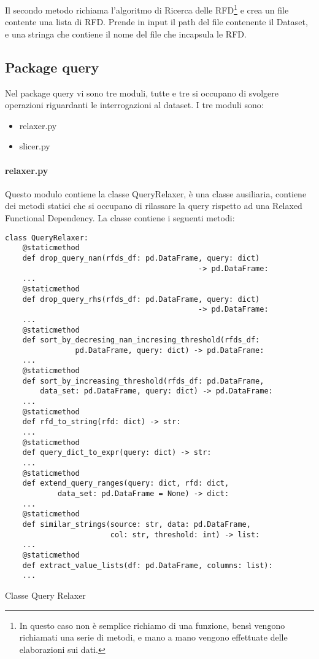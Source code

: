 Il secondo metodo richiama l'algoritmo di Ricerca delle RFD\footnote{In questo caso non è semplice richiamo di una funzione, bensì vengono richiamati una serie di metodi, e mano a mano vengono effettuate delle elaborazioni sui dati.} e crea un file contente una lista di RFD. Prende in input il path del file contenente il Dataset, e una stringa che contiene il nome del file che incapsula le RFD. 

\subsection{Package query}
Nel package query vi sono tre moduli, tutte e tre si occupano di svolgere operazioni riguardanti le interrogazioni al dataset.
I tre moduli sono:
\begin{itemize}[noitemsep]
\let\labelitemi\labelitemii
    \item relaxer.py
    \item slicer.py
\end{itemize}

\paragraph{relaxer.py}
Questo modulo contiene la classe QueryRelaxer, è una classe ausiliaria, contiene dei metodi statici che si occupano di rilassare la query rispetto ad una Relaxed Functional Dependency. La classe contiene i seguenti metodi:

\begin{listing}[H]
\begin{verbatim}
class QueryRelaxer:
    @staticmethod
    def drop_query_nan(rfds_df: pd.DataFrame, query: dict) 
                                            -> pd.DataFrame:
    ...
    @staticmethod
    def drop_query_rhs(rfds_df: pd.DataFrame, query: dict)
                                            -> pd.DataFrame:
    ...
    @staticmethod
    def sort_by_decresing_nan_incresing_threshold(rfds_df: 
                pd.DataFrame, query: dict) -> pd.DataFrame:
    ...
    @staticmethod
    def sort_by_increasing_threshold(rfds_df: pd.DataFrame,
        data_set: pd.DataFrame, query: dict) -> pd.DataFrame:
    ...
    @staticmethod
    def rfd_to_string(rfd: dict) -> str:
    ...
    @staticmethod
    def query_dict_to_expr(query: dict) -> str:
    ...
    @staticmethod
    def extend_query_ranges(query: dict, rfd: dict, 
            data_set: pd.DataFrame = None) -> dict:
    ...
    @staticmethod
    def similar_strings(source: str, data: pd.DataFrame,
                        col: str, threshold: int) -> list:
    ...
    @staticmethod
    def extract_value_lists(df: pd.DataFrame, columns: list):
    ...
\end{verbatim}
\caption{Classe Query Relaxer}
\label{Code:10}
\end{listing}

